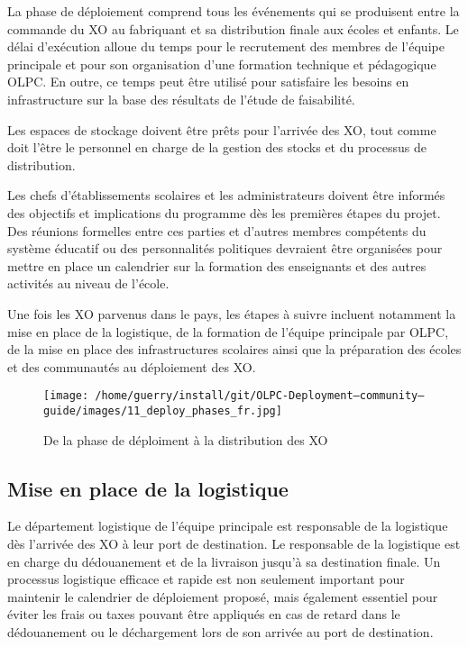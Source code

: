 \documentclass[12pt]{article}
\begin{document}
La phase de déploiement comprend tous les événements qui se produisent
entre la commande du XO au fabriquant et sa distribution finale aux écoles
et enfants. Le délai d'exécution alloue du temps pour le recrutement des
membres de l'équipe principale et pour son organisation d’une formation
technique et pédagogique OLPC. En outre, ce temps peut être utilisé pour
satisfaire les besoins en infrastructure sur la base des résultats de
l'étude de faisabilité.

Les espaces de stockage doivent être prêts pour l'arrivée des XO, tout
comme doit l'être le personnel en charge de la gestion des stocks et du
processus de distribution.

Les chefs d'établissements scolaires et les administrateurs doivent être
informés des objectifs et  implications du programme dès les premières
étapes du projet. Des réunions formelles entre ces parties et d'autres
membres compétents du système éducatif ou des personnalités politiques
devraient être organisées pour mettre en place un calendrier sur la
formation des enseignants et des autres activités au niveau de l'école.

Une fois les XO parvenus dans le pays, les étapes à suivre incluent
notamment la mise en place de la logistique, de la formation de l'équipe
principale par OLPC, de la mise en place des infrastructures scolaires
ainsi que la préparation des écoles et des communautés au déploiement des
XO.

\begin{figure}[htb]
\centering
\texttt{[image: /home/guerry/install/git/OLPC-Deployment--community--guide/images/11\_deploy\_phases\_fr.jpg]}
\caption{De la phase de déploiment à la distribution des XO}
\end{figure}
\subsection{Mise en place de la logistique}
\label{sec-9-1}



Le département logistique de l'équipe principale est responsable de la
logistique dès l'arrivée des XO à leur port de destination. Le responsable
de la logistique est en charge du dédouanement et de la livraison jusqu'à
sa destination finale. Un processus logistique efficace et rapide est non
seulement important pour maintenir le calendrier de déploiement proposé,
mais également essentiel pour éviter les frais ou taxes pouvant être
appliqués en cas de retard dans le dédouanement ou le déchargement lors de
son arrivée au port de destination.
\end{document}
